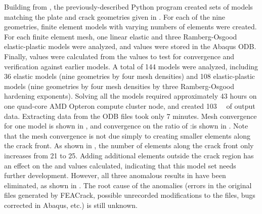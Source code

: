 %
%
\clearpage
Building from \citet{renfro2009}, the previously-described Python program created sets of models matching the plate and crack geometries given in .
For each of the nine geometries, finite element models with varying numbers of elements were created.
For each finite element mesh, one linear elastic and three Ramberg-Osgood elastic-plastic models were analyzed, and \J values were stored in the Abaqus ODB.
Finally, \hone values were calculated from the \J values to test for convergence and verification against earlier models.
A total of 144 models were analyzed, including 36 elastic models (nine geometries by four mesh densities) and 108 elastic-plastic models (nine geometries by four mesh densities by three Ramberg-Osgood hardening exponents).
Solving all the models required approximately 43 hours on one quad-core AMD Opteron compute cluster node, and created \SI{103}{\giga\byte} of output data. Extracting \hone data from the ODB files took only 7 minutes.
Mesh convergence for one model is shown in , and convergence on the ratio of \Jpl:\Jel is shown in .
Note that the mesh convergence is not due simply to creating smaller elements along the crack front.
As shown in , the number of elements along the crack front only increases from 21 to 25.
Adding additional elements outside the crack region has an effect on the \J and \hone values calculated, indicating that this model set needs further development.
However, all three anomalous \hone results in \citet{quillen2005} have been eliminated, as shown in .
The root cause of the anomalies (errors in the original files generated by FEACrack, possible unrecorded modifications to the files, bugs corrected in Abaqus, etc.) is still unknown.
